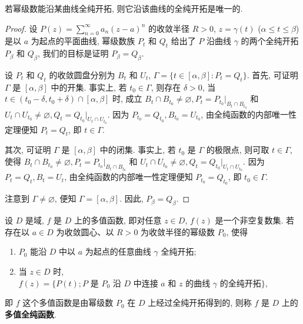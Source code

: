 \documentclass[../../main.tex]{subfiles}%
\begin{document}
\begin{proposition}\label{proposition:沿曲线的全纯开拓唯一}
若幂级数能沿某曲线全纯开拓, 则它沿该曲线的全纯开拓是唯一的.
\end{proposition}
\begin{proof}
设 \(P(z)=\sum\limits_{n=0}^{\infty} a_n(z-a)^n\) 的收敛半径 \(R>0\), \(z=\gamma(t)\) (\(\alpha\leqslant t\leqslant \beta\)) 是以 \(a\) 为起点的平面曲线, 幂级数族 \(P_t\) 和 \(Q_t\) 给出了 \(P\) 沿曲线 \(\gamma\) 的两个全纯开拓 \(P_\beta\) 和 \(Q_\beta\), 我们的目标是证明 \(P_\beta=Q_\beta\).

设 \(P_t\) 和 \(Q_t\) 的收敛圆盘分别为 \(B_t\) 和 \(U_t\), \(\Gamma=\{t\in[\alpha,\beta]: P_t=Q_t\}\). 首先, 可证明 \(\Gamma\) 是 \([\alpha,\beta]\) 中的开集. 事实上, 若 \(t_0\in\Gamma\), 则存在 \(\delta>0\), 当 \(t\in(t_0-\delta,t_0+\delta)\cap[\alpha,\beta]\) 时, 成立 \(B_t\cap B_{t_0}\neq\varnothing, P_t=P_{t_0}\Big|_{B_t\cap B_{t_0}}\) 和 \(U_t\cap U_{t_0}\neq\varnothing, Q_t=Q_{t_0}\Big|_{U_t\cap U_{t_0}}\). 因为 \(P_{t_0}=Q_{t_0}, B_{t_0}=U_{t_0}\), 由全纯函数的内部唯一性定理便知 \(P_t=Q_t\), 即 \(t\in\Gamma\).

其次, 可证明 \(\Gamma\) 是 \([\alpha,\beta]\) 中的闭集. 事实上, 若 \(t_0\) 是 \(\Gamma\) 的极限点, 则可取 \(t\in\Gamma\), 使得 \(B_t\cap B_{t_0}\neq\varnothing, P_t=P_{t_0}\Big|_{B_t\cap B_{t_0}}\) 和 \(U_t\cap U_{t_0}\neq\varnothing, Q_t=Q_{t_0}\Big|_{U_t\cap U_{t_0}}\). 因为 \(P_t=Q_t, B_t=U_t\), 由全纯函数的内部唯一性定理便知 \(P_{t_0}=Q_{t_0}\), 即 \(t_0\in\Gamma\).

注意到 \(\Gamma\neq\varnothing\), 便知 \(\Gamma=[\alpha,\beta]\). 因此, \(P_\beta=Q_\beta\).
\end{proof}

\begin{definition}
设 \(D\) 是域, \(f\) 是 \(D\) 上的多值函数, 即对任意 \(z\in D\), \(f(z)\) 是一个非空复数集. 若存在以 \(a\in D\) 为收敛圆心、以 \(R>0\) 为收敛半径的幂级数 \(P_0\), 使得
\begin{enumerate}[(1)]
\item \(P_0\) 能沿 \(D\) 中以 \(a\) 为起点的任意曲线 \(\gamma\) 全纯开拓;
\item 当 \(z\in D\) 时, \(f(z)=\{P(t); P \text{ 是 } P_0 \text{ 沿 } D \text{ 中连接 } a \text{ 和 } z \text{ 的曲线 } \gamma \text{ 的全纯开拓}\}\),
\end{enumerate}
即 \(f\) 这个多值函数是由幂级数 \(P_0\) 在 \(D\) 上经过全纯开拓得到的, 则称 \(f\) 是 \(D\) 上的\textbf{多值全纯函数}.
\end{definition}
\end{document}
